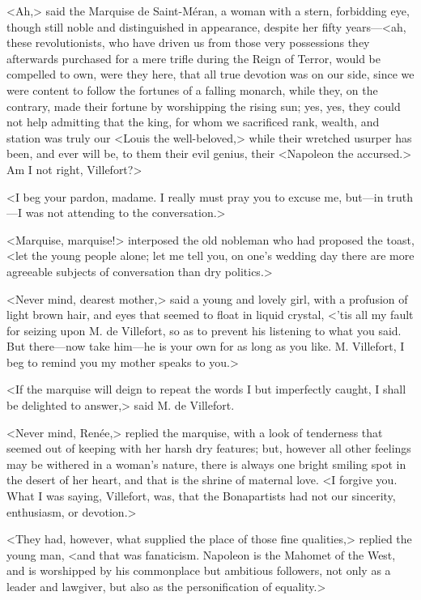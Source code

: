  <Ah,> said the Marquise de Saint-Méran, a woman with a stern, forbidding eye, though still noble and distinguished in appearance, despite her fifty years—<ah, these revolutionists, who have driven us from those very possessions they afterwards purchased for a mere trifle during the Reign of Terror, would be compelled to own, were they here, that all true devotion was on our side, since we were content to follow the fortunes of a falling monarch, while they, on the contrary, made their fortune by worshipping the rising sun; yes, yes, they could not help admitting that the king, for whom we sacrificed rank, wealth, and station was truly our <Louis the well-beloved,> while their wretched usurper has been, and ever will be, to them their evil genius, their <Napoleon the accursed.> Am I not right, Villefort?> 

 <I beg your pardon, madame. I really must pray you to excuse me, but—in truth—I was not attending to the conversation.> 

 <Marquise, marquise!> interposed the old nobleman who had proposed the toast, <let the young people alone; let me tell you, on one's wedding day there are more agreeable subjects of conversation than dry politics.> 

 <Never mind, dearest mother,> said a young and lovely girl, with a profusion of light brown hair, and eyes that seemed to float in liquid crystal, <'tis all my fault for seizing upon M. de Villefort, so as to prevent his listening to what you said. But there—now take him—he is your own for as long as you like. M. Villefort, I beg to remind you my mother speaks to you.> 

 <If the marquise will deign to repeat the words I but imperfectly caught, I shall be delighted to answer,> said M. de Villefort. 

 <Never mind, Renée,> replied the marquise, with a look of tenderness that seemed out of keeping with her harsh dry features; but, however all other feelings may be withered in a woman's nature, there is always one bright smiling spot in the desert of her heart, and that is the shrine of maternal love. <I forgive you. What I was saying, Villefort, was, that the Bonapartists had not our sincerity, enthusiasm, or devotion.> 

 <They had, however, what supplied the place of those fine qualities,> replied the young man, <and that was fanaticism. Napoleon is the Mahomet of the West, and is worshipped by his commonplace but ambitious followers, not only as a leader and lawgiver, but also as the personification of equality.> 

